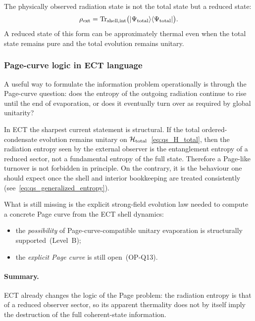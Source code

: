 The physically observed radiation state is not the total state but
a reduced state:
\begin{equation}
  \label{eq:qs_rho_ext}
  \rho_{\rm ext}
  =
  \mathrm{Tr}_{{\rm shell,int}}
  \bigl(|\Psi_{\rm total}\rangle\langle\Psi_{\rm total}|\bigr).
\end{equation}
A reduced state of this form can be approximately thermal even when
the total state remains pure and the total evolution remains unitary.

\subsubsection*{Page-curve logic in ECT language}

A useful way to formulate the information problem operationally is through
the Page-curve question: does the entropy of the outgoing radiation
continue to rise until the end of evaporation, or does it eventually turn
over as required by global unitarity?

In ECT the sharpest current statement is structural.
If the total ordered-condensate evolution remains unitary on
$\mathcal{H}_{\rm total}$~\eqref{eq:qs_H_total}, then the radiation
entropy seen by the external observer is the entanglement entropy of a
reduced sector, not a fundamental entropy of the full state.
Therefore a Page-like turnover is not forbidden in principle.
On the contrary, it is the behaviour one should expect once the shell and
interior bookkeeping are treated consistently
(see~\eqref{eq:qs_generalized_entropy}).

What is still missing is the explicit strong-field evolution law needed to
compute a concrete Page curve from the ECT shell dynamics:
\begin{itemize}
  \item the \emph{possibility} of Page-curve-compatible unitary
    evaporation is structurally supported~(Level~B);
  \item the \emph{explicit Page curve} is still open~(OP-Q13).
\end{itemize}

\paragraph{Summary.}
ECT already changes the logic of the Page problem: the radiation entropy
is that of a reduced observer sector, so its apparent thermality does not
by itself imply the destruction of the full coherent-state information.


